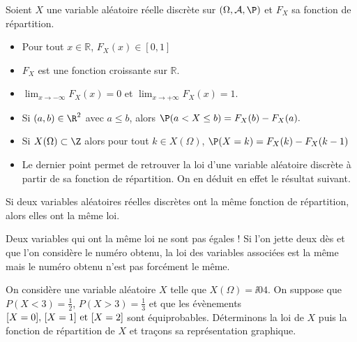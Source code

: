 \documentclass[french,11pt,twoside]{VcCours}
\begin{document}
\begin{Proposition}{}
Soient $X$ une variable aléatoire réelle discrète sur $(\Omega, \mathcal{A}, \P)$ et $F_X$ sa fonction de répartition.
\begin{itemize}
\item Pour tout $ x \in \mathbb{R}$, $F_X(x) \in [0,1]$
\item $F_X$ est une fonction croissante sur $\mathbb{R}$.
\item $\lim_{x\to -\infty} F_X(x) =0$ et $\lim_{x\to +\infty} F_X(x) = 1$.
\item Si $(a,b)\in\R^2$ avec $a\leq b$, alors $\P(a < X \leq b) = F_X(b)-F_X(a).$
\end{itemize}
\end{Proposition}

\begin{Demonstration}{}

\vspace*{10cm}
\end{Demonstration}

\begin{Remarques}{}
\begin{itemize}
\item Si $X(\Omega)\subset \Z$ alors pour tout $k \in X(\Omega)$, $\P(X=k)= F_X(k)-F_X(k-1)$
\item Le dernier point permet de retrouver la loi d'une variable aléatoire discrète à partir de sa fonction de répartition. On en déduit en effet le résultat suivant.
\end{itemize}
\end{Remarques}

\begin{Proposition}{}
Si deux variables aléatoires réelles discrètes ont la même fonction de répartition, alors elles ont la même loi.
\end{Proposition}

\begin{Remarque}[\alerte]{} Deux variables qui ont la même loi ne sont pas égales ! Si l'on jette deux dès et que l'on considère le numéro obtenu, la loi des variables associées est la même mais le numéro obtenu n'est pas forcément le même.
\end{Remarque}


\begin{Exemple}{} On considère une variable aléatoire $X$ telle que $X(\Omega) = \ii04$. On suppose que $P(X<3) = \frac{1}{2}$, $P(X>3)= \frac{1}{3}$ et que les évènements $[X=0], \, [X=1] \hbox{ et } [X=2]$ sont équiprobables. Déterminons la loi de $X$ puis la fonction de répartition de $X$ et traçons sa représentation graphique.

\vspace*{10cm}
\end{Exemple}
\end{document}
